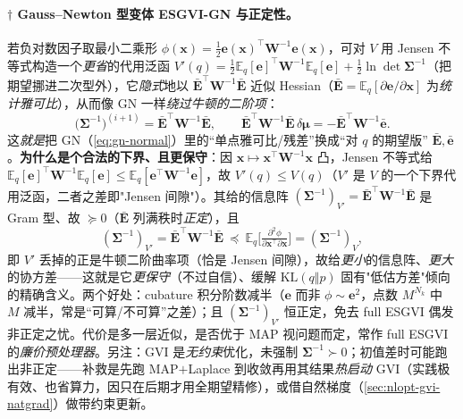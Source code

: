 \paragraph{$\dagger$ Gauss--Newton 型变体 ESGVI-GN 与正定性。}
若负对数因子取最小二乘形 $\phi(\mathbf{x})=\tfrac12\mathbf{e}(\mathbf{x})^\top\mathbf{W}^{-1}\mathbf{e}(\mathbf{x})$，可对 $V$ 用 Jensen 不等式构造一个\emph{更省}的代用泛函 $V'(q)=\tfrac12\mathbb{E}_q[\mathbf{e}]^\top\mathbf{W}^{-1}\mathbb{E}_q[\mathbf{e}]+\tfrac12\ln\det\boldsymbol{\Sigma}^{-1}$（把期望挪进二次型外），它\emph{隐式}地以 $\bar{\mathbf{E}}^\top\mathbf{W}^{-1}\bar{\mathbf{E}}$ 近似 Hessian（$\bar{\mathbf{E}}=\mathbb{E}_q[\partial\mathbf{e}/\partial\mathbf{x}]$ 为\emph{统计雅可比}），从而像 GN 一样\emph{绕过牛顿的二阶项}：
\begin{equation}
  \big(\boldsymbol{\Sigma}^{-1}\big)^{(i+1)}=\bar{\mathbf{E}}^\top\mathbf{W}^{-1}\bar{\mathbf{E}},\qquad
  \bar{\mathbf{E}}^\top\mathbf{W}^{-1}\bar{\mathbf{E}}\,\delta\boldsymbol{\mu}=-\bar{\mathbf{E}}^\top\mathbf{W}^{-1}\bar{\mathbf{e}}.
  \label{eq:gvi-gn}
\end{equation}
这\emph{就是}把 GN（\cref{eq:gn-normal}）里的“单点雅可比/残差”换成“对 $q$ 的期望版” $\bar{\mathbf{E}},\bar{\mathbf{e}}$。\textbf{为什么是个合法的下界、且更保守}：因 $\mathbf{x}\mapsto\mathbf{x}^\top\mathbf{W}^{-1}\mathbf{x}$ 凸，Jensen 不等式给 $\mathbb{E}_q[\mathbf{e}]^\top\mathbf{W}^{-1}\mathbb{E}_q[\mathbf{e}]\le\mathbb{E}_q[\mathbf{e}^\top\mathbf{W}^{-1}\mathbf{e}]$，故 $V'(q)\le V(q)$（$V'$ 是 $V$ 的一个下界代用泛函，二者之差即"Jensen 间隙"）。其给的信息阵 $(\boldsymbol{\Sigma}^{-1})_{V'}=\bar{\mathbf{E}}^\top\mathbf{W}^{-1}\bar{\mathbf{E}}$ 是 Gram 型、故 $\succeq0$（$\bar{\mathbf{E}}$ 列满秩时\emph{正定}），且
\begin{equation}
  (\boldsymbol{\Sigma}^{-1})_{V'}=\bar{\mathbf{E}}^\top\mathbf{W}^{-1}\bar{\mathbf{E}}\ \preceq\ \mathbb{E}_q\!\Big[\tfrac{\partial^2\phi}{\partial\mathbf{x}^\top\partial\mathbf{x}}\Big]=(\boldsymbol{\Sigma}^{-1})_{V},
  \label{eq:gvi-gn-conserv}
\end{equation}
即 $V'$ 丢掉的正是牛顿二阶曲率项（恰是 Jensen 间隙），故给\emph{更小}的信息阵、\emph{更大}的协方差——这就是它\emph{更保守}（不过自信）、缓解 $\mathrm{KL}(q\Vert p)$ 固有"低估方差"倾向的精确含义。两个好处：cubature 积分阶数减半（$\mathbf{e}$ 而非 $\phi\sim\mathbf{e}^2$，点数 $M^{N_k}$ 中 $M$ 减半，常是“可算/不可算”之差）；且 $(\boldsymbol{\Sigma}^{-1})_{V'}$ 恒正定，免去 full ESGVI 偶发非正定之忧。代价是多一层近似，是否优于 MAP 视问题而定，常作 full ESGVI 的\emph{廉价预处理器}。另注：GVI 是\emph{无约束}优化，未强制 $\boldsymbol{\Sigma}^{-1}\succ0$；初值差时可能跑出非正定——补救是先跑 MAP$+$Laplace 到收敛再用其结果\emph{热启动} GVI（实践极有效、也省算力，因只在后期才用全期望精修），或借自然梯度（\cref{sec:nlopt-gvi-natgrad}）做带约束更新\cite{barfoot2024state}。

